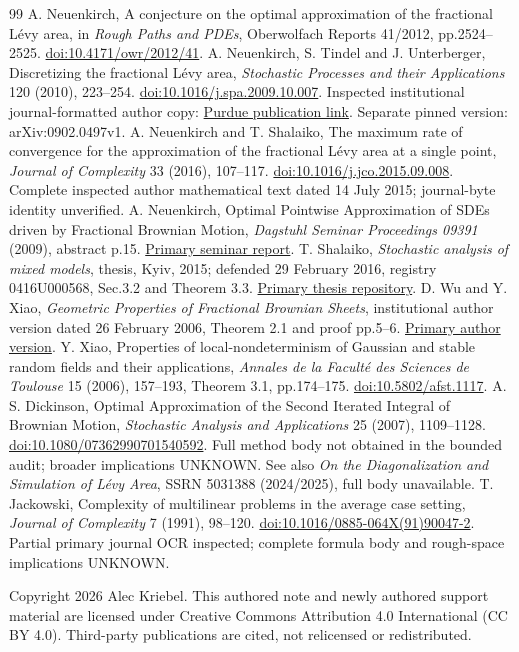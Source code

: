 \documentclass[11pt]{article}
\begin{document}
\begin{thebibliography}{99}
 A. Neuenkirch, A conjecture on the optimal approximation of the fractional L\'evy area, in \emph{Rough Paths and PDEs}, Oberwolfach Reports 41/2012, pp.2524--2525. \href{https://doi.org/10.4171/owr/2012/41}{doi:10.4171/owr/2012/41}.
 A. Neuenkirch, S. Tindel and J. Unterberger, Discretizing the fractional L\'evy area, \emph{Stochastic Processes and their Applications} 120 (2010), 223--254. \href{https://doi.org/10.1016/j.spa.2009.10.007}{doi:10.1016/j.spa.2009.10.007}. Inspected institutional journal-formatted author copy: \href{https://www.math.purdue.edu/~stindel/publication/papers-online/discretize-levy-area.pdf}{Purdue publication link}. Separate pinned version: arXiv:0902.0497v1.
 A. Neuenkirch and T. Shalaiko, The maximum rate of convergence for the approximation of the fractional L\'evy area at a single point, \emph{Journal of Complexity} 33 (2016), 107--117. \href{https://doi.org/10.1016/j.jco.2015.09.008}{doi:10.1016/j.jco.2015.09.008}. Complete inspected author mathematical text dated 14 July 2015; journal-byte identity unverified.
 A. Neuenkirch, Optimal Pointwise Approximation of SDEs driven by Fractional Brownian Motion, \emph{Dagstuhl Seminar Proceedings 09391} (2009), abstract p.15. \href{https://drops.dagstuhl.de/storage/16dagstuhl-seminar-proceedings/dsp-vol09391/DagSemProc.09391.1/DagSemProc.09391.1.pdf}{Primary seminar report}.
 T. Shalaiko, \emph{Stochastic analysis of mixed models}, thesis, Kyiv, 2015; defended 29 February 2016, registry 0416U000568, Sec.3.2 and Theorem 3.3. \href{https://uacademic.info/download/file/0416U000568/dis.pdf}{Primary thesis repository}.
 D. Wu and Y. Xiao, \emph{Geometric Properties of Fractional Brownian Sheets}, institutional author version dated 26 February 2006, Theorem 2.1 and proof pp.5--6. \href{https://www.stt.msu.edu/~xiaoyimi/XW91.pdf}{Primary author version}.
 Y. Xiao, Properties of local-nondeterminism of Gaussian and stable random fields and their applications, \emph{Annales de la Facult\'e des Sciences de Toulouse} 15 (2006), 157--193, Theorem 3.1, pp.174--175. \href{https://doi.org/10.5802/afst.1117}{doi:10.5802/afst.1117}.
 A. S. Dickinson, Optimal Approximation of the Second Iterated Integral of Brownian Motion, \emph{Stochastic Analysis and Applications} 25 (2007), 1109--1128. \href{https://doi.org/10.1080/07362990701540592}{doi:10.1080/07362990701540592}. Full method body not obtained in the bounded audit; broader implications UNKNOWN. See also \emph{On the Diagonalization and Simulation of L\'evy Area}, SSRN 5031388 (2024/2025), full body unavailable.
 T. Jackowski, Complexity of multilinear problems in the average case setting, \emph{Journal of Complexity} 7 (1991), 98--120. \href{https://doi.org/10.1016/0885-064X(91)90047-2}{doi:10.1016/0885-064X(91)90047-2}. Partial primary journal OCR inspected; complete formula body and rough-space implications UNKNOWN.
\end{thebibliography}
\vspace{1ex}\noindent\small Copyright 2026 Alec Kriebel. This authored note and newly authored support material are licensed under Creative Commons Attribution 4.0 International (CC BY 4.0). Third-party publications are cited, not relicensed or redistributed.
\end{document}
